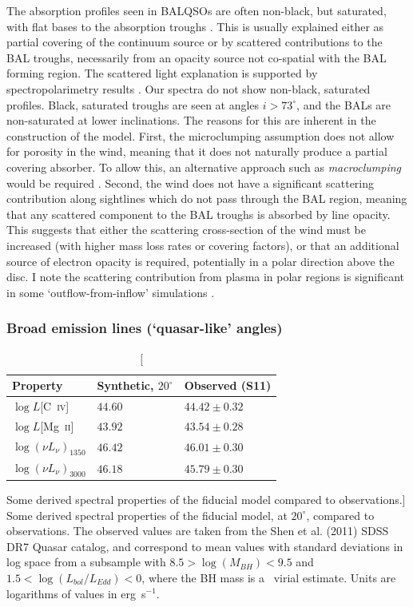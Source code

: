 The absorption profiles seen in BALQSOs are often non-black, but saturated, 
with flat bases to the absorption troughs \citep{arav1999b,arav1999a}.
This is usually explained either as  partial covering of the continuum
source or by scattered contributions to the BAL troughs, necessarily
from an opacity source not co-spatial with the BAL forming region.
The scattered light explanation is supported by spectropolarimetry results
\citep{lamy2000}. Our spectra do not show non-black, saturated profiles.
Black, saturated troughs are seen at angles $i > 73^\circ$, and the BALs
are non-saturated at lower inclinations. The reasons for this are inherent 
in the construction of the model. 
First, the microclumping assumption does not allow for 
porosity in the wind, meaning that it does not naturally produce
a partial covering absorber. To allow this, an alternative approach
such as {\em macroclumping} would be required \citep[e.g.][]{hamann2008,surlan2012}.
Second, the wind does not have a significant scattering contribution 
along sightlines which do not pass through the BAL region,
meaning that any scattered component to the BAL troughs is absorbed by line opacity.
This suggests that either the scattering cross-section of the wind must
be increased (with higher mass loss rates or covering factors), or 
that an additional source of electron opacity is required, potentially
in a polar direction above the disc. I note the scattering contribution
from plasma in polar regions is significant in some `outflow-from-inflow'
simulations \citep{KP09, simproga2012}.

\subsubsection{Broad emission lines (`quasar-like' angles)}

\begin{table}
\centering
\begin{tabular}{p{2cm}p{2cm}p{3cm}}
\hline Property & Synthetic, $20^\circ$ & Observed  (S11) \\ 
\hline \hline
$\log L$[C~\textsc{iv}]  & $44.60$ & $44.42 \pm 0.32$  \\
$\log L$[Mg~\textsc{ii}] & $43.92$ & $43.54 \pm 0.28$  \\
$\log (\nu L_{\nu})_{1350}$  & $46.42$ & $46.01 \pm 0.30$ \\
$\log (\nu L_{\nu})_{3000}$  & $46.18$ & $45.79 \pm 0.30$ \\
\hline
\end{tabular}
\caption
[Some derived spectral properties of the fiducial model compared to observations.]
{
Some derived spectral properties of the fiducial model, at $20^\circ$,
compared to observations. The observed values are taken from the Shen et al. (2011)
SDSS DR7 Quasar catalog, and correspond to mean values with standard deviations in log space
from a subsample with $8.5>\log(M_{BH})<9.5$ and $1.5<\log (L_{bol}/L_{Edd}) < 0$,
where the BH mass is a \civ\ virial estimate. 
Units are logarithms of values in erg~s$^{-1}$.
}
\label{line_lums}
\end{table}


